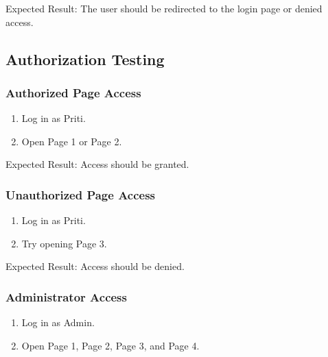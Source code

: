 \documentclass[letterpaper,10pt,english]{sphinxmanual}
\begin{document}
\sphinxAtStartPar
Expected Result: The user should be redirected to the login page or denied
access.


\subsection{Authorization Testing}
\label{\detokenize{testing:authorization-testing}}

\subsubsection{Authorized Page Access}
\label{\detokenize{testing:authorized-page-access}}\begin{enumerate}
%
\item {} 
\sphinxAtStartPar
Log in as Priti.

\item {} 
\sphinxAtStartPar
Open Page 1 or Page 2.

\end{enumerate}

\sphinxAtStartPar
Expected Result: Access should be granted.


\subsubsection{Unauthorized Page Access}
\label{\detokenize{testing:unauthorized-page-access}}\begin{enumerate}
%
\item {} 
\sphinxAtStartPar
Log in as Priti.

\item {} 
\sphinxAtStartPar
Try opening Page 3.

\end{enumerate}

\sphinxAtStartPar
Expected Result: Access should be denied.


\subsubsection{Administrator Access}
\label{\detokenize{testing:administrator-access}}\begin{enumerate}
%
\item {} 
\sphinxAtStartPar
Log in as Admin.

\item {} 
\sphinxAtStartPar
Open Page 1, Page 2, Page 3, and Page 4.

\end{enumerate}
\end{document}
